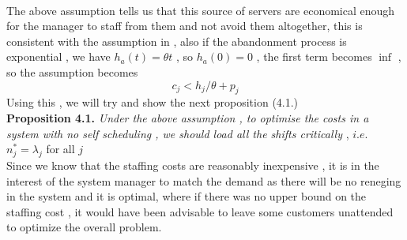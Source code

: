 \\ The above assumption tells us that this source of servers are economical enough for the manager to staff from them and not avoid them altogether, this is consistent with the assumption in \cite{bassamboo} , also if the abandonment process is exponential , we have $h_a(t) = \theta t$ , so $h_a(0) =0$ , the first term becomes $\inf$ , so the assumption becomes
\begin{equation}
    c_j < h_j/\theta +p_j
\end{equation}
Using this , we will try and show the next proposition (4.1.)
\\\textbf{Proposition 4.1.} \textit {Under the above assumption , to optimise the costs in a system with no self scheduling , we should load all the shifts critically} , $i.e.$ $n_j^{*}=\lambda_j$ for all $j$
\\Since we know that the staffing costs are reasonably inexpensive , it is in the interest of the system manager to match the demand as there will be no reneging in the system and it is optimal, where if there was no upper bound on the staffing cost , it would have been advisable to leave some customers unattended to optimize the overall problem.
